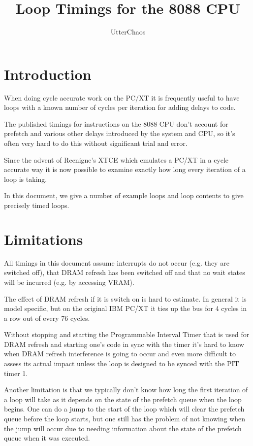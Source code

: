 \documentclass[a4paper,10pt]{amsart}
\title{Loop Timings for the 8088 CPU}
\author{UtterChaos}
\begin{document}
\maketitle

\section{Introduction}

When doing cycle accurate work on the PC/XT it is frequently useful to have
loops with a known number of cycles per iteration for adding delays to code.

The published timings for instructions on the 8088 CPU don't account for
prefetch and various other delays introduced by the system and CPU, so it's
often very hard to do this without significant trial and error.

Since the advent of Reenigne's XTCE which emulates a PC/XT in a cycle
accurate way it is now possible to examine exactly how long every iteration
of a loop is taking.

In this document, we give a number of example loops and loop contents to
give precisely timed loops.

\section{Limitations}

All timings in this document assume interrupts do not occur (e.g. they are
switched off), that DRAM refresh has been switched off and that no wait
states will be incurred (e.g. by accessing VRAM).

The effect of DRAM refresh if it is switch on is hard to estimate. In general
it is model specific, but on the original IBM PC/XT it ties up the bus for 4
cycles in a row out of every 76 cycles.

Without stopping and starting the Programmable Interval Timer that is used
for DRAM refresh and starting one's code in sync with the timer it's hard to
know when DRAM refresh interference is going to occur and even more difficult
to assess its actual impact unless the loop is designed to be synced with the
PIT timer 1.

Another limitation is that we typically don't know how long the first
iteration of a loop will take as it depends on the state of the prefetch
queue when the loop begins. One can do a jump to the start of the loop
which will clear the prefetch queue before the loop starts, but one still
has the problem of not knowing when the jump will occur due to needing
information about the state of the prefetch queue when it was executed.
\end{document}
